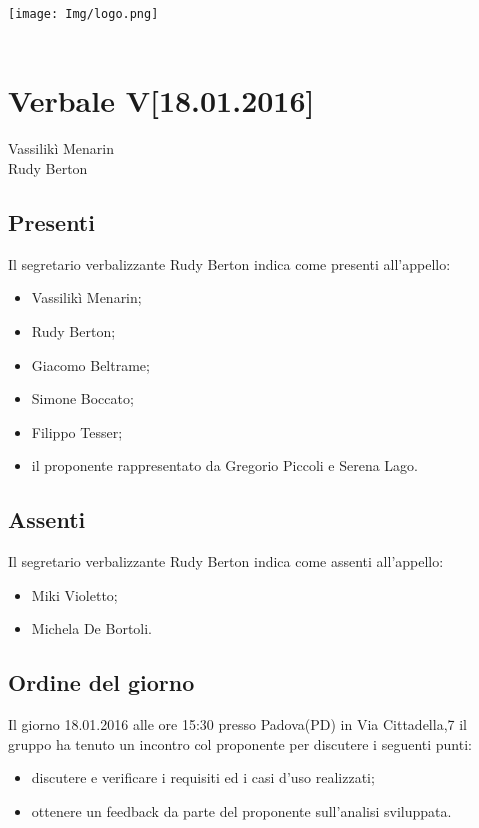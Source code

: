 \documentclass[a4paper]{article}
\def\DATA{18.01.2016}
\def\ORA{15:30}
\def\CITTA{Padova}
\def\PROVINCIA{PD}
\def\VIA{Via Cittadella,7}
\def\SEGRETARIO{Rudy Berton}
\def\RESPONSABILE{Vassilikì Menarin}
\begin{document}
\begin{center}
\texttt{[image: Img/logo.png]}\\
\vspace{1cm}
{\Huge \PROGETTO}\\
\vspace{1cm}
\section*{Verbale V[\DATA]}
\end{center}

%
%
 \RESPONSABILE
\\  \SEGRETARIO
\\
\subsection*{Presenti}
Il segretario verbalizzante \SEGRETARIO{} indica come presenti all'appello:
\begin{itemize}
\item Vassilikì Menarin;
\item Rudy Berton;
\item Giacomo Beltrame;
\item Simone Boccato;
\item Filippo Tesser;
\item il proponente rappresentato da Gregorio Piccoli e Serena Lago.
\end{itemize}

\subsection*{Assenti}
Il segretario verbalizzante \SEGRETARIO{} indica come assenti all'appello:
\begin{itemize}
\item Miki Violetto;
\item Michela De Bortoli.
\end{itemize}

\subsection*{Ordine del giorno}
Il giorno \DATA{} alle ore \ORA{} presso \CITTA (\PROVINCIA) in \VIA{} il gruppo \AUTORE{} ha tenuto un incontro col proponente per discutere i seguenti punti:
\begin{itemize}
\item discutere e verificare i requisiti ed i casi d'uso realizzati;
\item ottenere un feedback da parte del proponente sull'analisi sviluppata.
\end{itemize}
\end{document}
